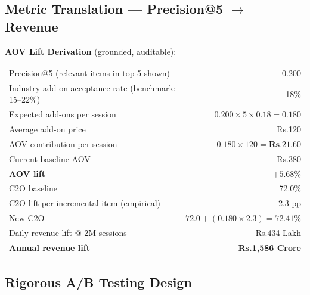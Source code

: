 \documentclass[11pt,a4paper]{article}
\newcommand{\TO}{$\rightarrow$}
\begin{document}
\subsection{Metric Translation --- Precision@5 \TO{} Revenue}

\begin{metricbox}
\textbf{AOV Lift Derivation} (grounded, auditable):

\medskip
{\small
\begin{center}
\begin{tabularx}{\linewidth}{>{\RaggedRight\arraybackslash}X r}
  \toprule
  Precision@5 (relevant items in top 5 shown) & 0.200 \\
  Industry add-on acceptance rate (benchmark: 15--22\%) & 18\% \\
  \midrule
  Expected add-ons per session &
    $0.200 \times 5 \times 0.18 = \mathbf{0.180}$ \\
  Average add-on price & Rs.120 \\
  AOV contribution per session &
    $0.180 \times 120 = \mathbf{Rs.21.60}$ \\
  Current baseline AOV & Rs.380 \\
  \textbf{AOV lift} & $\mathbf{+5.68\%}$ \\
  \midrule
  C2O baseline & 72.0\% \\
  C2O lift per incremental item (empirical) & +2.3 pp \\
  New C2O & $72.0 + (0.180 \times 2.3) = \mathbf{72.41\%}$ \\
  \midrule
  Daily revenue lift @ 2M sessions & Rs.434 Lakh \\
  \textbf{Annual revenue lift} & \textbf{Rs.1{,}586 Crore} \\
  \bottomrule
\end{tabularx}
\end{center}
}
\end{metricbox}

\subsection{Rigorous A/B Testing Design}
\end{document}
